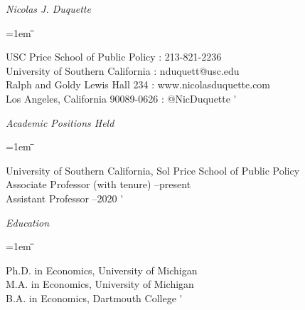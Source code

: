 \documentclass[12pt]{article}
\newlength{\midlength}
\newlength{\firstlength}
\newlength{\listindent}
\newcommand{\heading}[1]{
	{\setlength{\parskip}{0.8cm plus6mm minus3mm}
	\parindent=0pt
	\large \textit{{#1}}}
	\vspace{0.1em}
}
\newenvironment{datetabbing}{
	\begin{tabbing}
	\parskip=1em
	\hspace*{\listindent}\=\hspace*{\firstlength}\=\hspace*{\midlength}\= \kill
}{
	\end{tabbing}
}
\begin{document}

\noindent
{\Large \textit{Nicolas J. Duquette}}
\begin{datetabbing}
	USC Price School of Public Policy		\>\>\>	\faPhone: 213-821-2236						\'	\\
	University of Southern California		\>\>\>	: nduquett@usc.edu			\'	\\
	Ralph and Goldy Lewis Hall 234			\>\>\>	\faGlobe: www.nicolasduquette.com			\'	\\
	Los Angeles, California 90089-0626  		\>\>\>	\faTwitter: @NicDuquette					\'	%
\end{datetabbing}


				
\heading{Academic Positions Held}

\begin{datetabbing}
\>	University of Southern California, Sol Price School of Public Policy			\\
\>	\>	Associate Professor	(with tenure)				--present	\'	\\	%
\>	\>	Assistant Professor								--2020		\'	%
\end{datetabbing}

\heading{Education}

\begin{datetabbing}
\>	Ph.D. in Economics, University of Michigan			\>\>	2014	\' 		\\
\>	M.A. in Economics, University of Michigan			\>\>	2010	\' 		\\
\>	B.A. in Economics,	Dartmouth College				\>\>	2004	\' %
\end{datetabbing}


\end{document}
